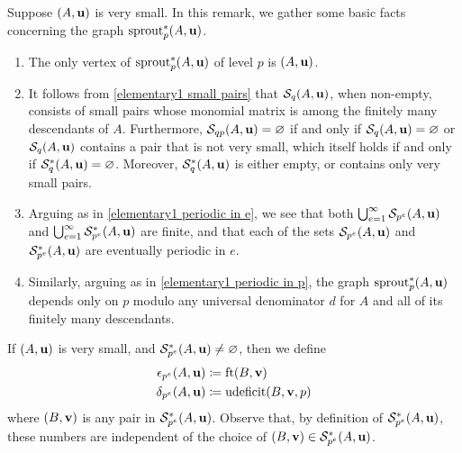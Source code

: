 \documentclass[11pt]{amsart}
\newcommand{\udeficit}{\operatorname{udeficit}}
\newcommand{\denom}{d}
\renewcommand{\S}{\mathcal{S}}
\begin{document}
\begin{remark}
   \label{elementary2: R}
   Suppose $(A,\mathbf{u})$ is very small.
   In this remark, we gather some basic facts  concerning the graph $\operatorname{sprout}^{\ast}_p(A,\mathbf{u})$.
   \begin{enumerate}
      \item  \label{elementary2 lowest level}
      The only vertex of $\operatorname{sprout}_p^{\ast}(A,\mathbf{u})$ of level $p$ is $(A,\mathbf{u})$.
      \item \label{elementary2 small pairs}
      It follows from \eqref{elementary1 small pairs} that $\S_{q}(A,\vv{u})$, when non-empty, consists of small pairs whose monomial matrix is among the finitely many descendants of $A$.
      Furthermore, $\S_{qp}(A,\vv{u}) = \emptyset$ if and only if $\S_q(A,\vv{u}) = \emptyset$ or $\S_q(A,\vv{u})$ contains a pair that is not very small, which itself holds if and only if $\S_{q}^{\ast}(A,\vv{u})= \emptyset$.
      Moreover, $\S_q^{\ast}(A,\vv{u})$ is either empty, or contains only very small pairs.
      \item \label{elementary2 periodic in e}
      Arguing as in \eqref{elementary1 periodic in e}, we see that both $\bigcup_{e=1}^{\infty} \S_{p^e}(A,\vv{u})$ and  $\bigcup_{e=1}^{\infty} \S^{\ast}_{p^e}(A,\vv{u})$ are finite, and that each of the sets $\S_{p^e}(A,\vv{u})$ and $\S^{\ast}_{p^e}(A,\vv{u})$ are eventually periodic in $e$.
      \item \label{elementary2 periodic in p}
      Similarly, arguing as in \eqref{elementary1 periodic in p}, the graph $\operatorname{sprout}_p^{\ast}(A,\mathbf{u})$ depends only on $p$ modulo any universal denominator $\denom$ for $A$  and all of its finitely many descendants.
   \end{enumerate}
\end{remark}

\begin{definition}
   \label{epsilon delta: D}
   If $(A,\mathbf{u})$ is very small, and $\S^{\ast}_{p^e}(A,\vv{u}) \neq \emptyset$, then we define
   \begin{align*}
     \epsilon_{p^e}(A,\vv{u}) & \coloneqq \ft{B}{\vv{v}} \\
     \delta_{p^e}(A,\vv{u}) & \coloneqq \udeficit(B,\vv{v},p)
   \end{align*}
   where $(B,\mathbf{v})$ is any pair in $\S^{\ast}_{p^e}(A,\vv{u})$.
   Observe that, by definition of $\S^{\ast}_{p^e}(A,\vv{u})$, these numbers are independent of the choice of $(B,\vv{v}) \in \S^{\ast}_{p^e}(A,\vv{u})$.
\end{definition}
\end{document}
